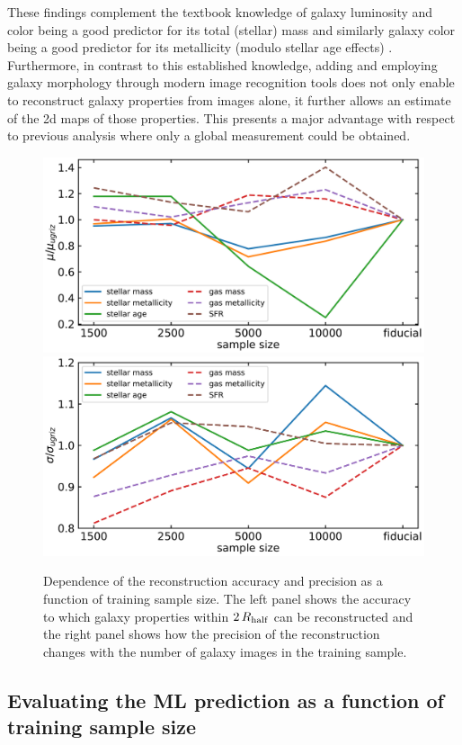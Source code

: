 \documentclass[useAMS,usenatbib]{mnras}
\begin{document}
These findings complement the textbook knowledge of galaxy luminosity and color being a good predictor for its total (stellar) mass \citep[e.g.][]{Kauffmann2003} and similarly galaxy color being a good predictor for its metallicity (modulo stellar age effects) \citep[e.g.][]{Tremonti2004,Gallazzi2005}. Furthermore, in contrast to this established knowledge, adding and employing galaxy morphology through modern image recognition tools does not only enable to reconstruct galaxy properties from images alone, it further allows an estimate of the 2d maps of those properties. This presents a major advantage with respect to previous analysis where only a global measurement could be obtained.

\begin{figure}
\begin{center}
\includegraphics[width=.5\textwidth]{./plots/sample_comparison_mu.pdf}
\includegraphics[width=.4875\textwidth]{./plots/sample_comparison_sigma.pdf}
\end{center}
\vspace{-.35cm}
\caption{Dependence of the reconstruction accuracy and precision as a function of training sample size. The left panel shows the accuracy to which galaxy properties within $2\,R_{\rm half}$ can be reconstructed and the right panel shows how the precision of the reconstruction changes with the number of galaxy images in the training sample.}
\label{fig:sample_comp}
\end{figure}


\subsection{Evaluating the ML prediction as a function of training sample size}
\label{sec:sample_size}
\end{document}
